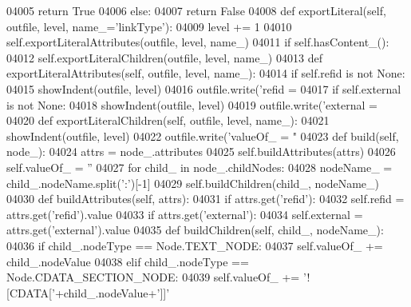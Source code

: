 \begin{DoxyCode}
{{{{{{{{{{{{{{{{{{{{{{{{{{{{{{{{{{{{{{{{{{{{{{{{{{{{{{{{{{{{{{{{{{{{{{{{{{{{{{{{{{{{{{{{{{{{{{{{{{{{{{{{{{{{{{{{{{{{{{{{{{{{{{{{{{{{{{{{{{{{{{{{{{{{{{{{{{{{{{{{{{{{{{{{{{{{{{{{{{{{{{{{{{{{{{{{{{{{{{{{{{{{{{{{{{{{{{{{{{{{{{{{{{{{{{{{{{{{{{{{{{{{{{{{{{{{{{{{{{{{{{04005             \textcolor{keywordflow}{return} \textcolor{keyword}{True}
04006         \textcolor{keywordflow}{else}:
04007             \textcolor{keywordflow}{return} \textcolor{keyword}{False}
04008     \textcolor{keyword}{def }exportLiteral(self, outfile, level, name\_='linkType'):
04009         level += 1
04010         self.exportLiteralAttributes(outfile, level, name\_)
04011         \textcolor{keywordflow}{if} self.hasContent_():
04012             self.exportLiteralChildren(outfile, level, name\_)
04013     \textcolor{keyword}{def }exportLiteralAttributes(self, outfile, level, name\_):
04014         \textcolor{keywordflow}{if} self.refid \textcolor{keywordflow}{is} \textcolor{keywordflow}{not} \textcolor{keywordtype}{None}:
04015             showIndent(outfile, level)
04016             outfile.write(\textcolor{stringliteral}{'refid = %
04017         \textcolor{keywordflow}{if} self.external \textcolor{keywordflow}{is} \textcolor{keywordflow}{not} \textcolor{keywordtype}{None}:
04018             showIndent(outfile, level)
04019             outfile.write(\textcolor{stringliteral}{'external = %
04020     \textcolor{keyword}{def }exportLiteralChildren(self, outfile, level, name\_):
04021         showIndent(outfile, level)
04022         outfile.write(\textcolor{stringliteral}{'valueOf\_ = "%
04023     \textcolor{keyword}{def }build(self, node\_):
04024         attrs = node\_.attributes
04025         self.buildAttributes(attrs)
04026         self.valueOf_ = \textcolor{stringliteral}{''}
04027         \textcolor{keywordflow}{for} child\_ \textcolor{keywordflow}{in} node\_.childNodes:
04028             nodeName\_ = child\_.nodeName.split(\textcolor{stringliteral}{':'})[-1]
04029             self.buildChildren(child\_, nodeName\_)
04030     \textcolor{keyword}{def }buildAttributes(self, attrs):
04031         \textcolor{keywordflow}{if} attrs.get(\textcolor{stringliteral}{'refid'}):
04032             self.refid = attrs.get(\textcolor{stringliteral}{'refid'}).value
04033         \textcolor{keywordflow}{if} attrs.get(\textcolor{stringliteral}{'external'}):
04034             self.external = attrs.get(\textcolor{stringliteral}{'external'}).value
04035     \textcolor{keyword}{def }buildChildren(self, child\_, nodeName\_):
04036         \textcolor{keywordflow}{if} child\_.nodeType == Node.TEXT\_NODE:
04037             self.valueOf_ += child\_.nodeValue
04038         \textcolor{keywordflow}{elif} child\_.nodeType == Node.CDATA\_SECTION\_NODE:
04039             self.valueOf_ += \textcolor{stringliteral}{'![CDATA['}+child\_.nodeValue+\textcolor{stringliteral}{']]'}
}}}}}}}}}}}}}}}}}}}}}}}}}}}}}}}}}}}}}}}}}}}}}}}}}}}}}}}}}}}}}}}}}}}}}}}}}}}}}}}}}}}}}}}}}}}}}}}}}}}}}}}}}}}}}}}}}}}}}}}}}}}}}}}}}}}}}}}}}}}}}}}}}}}}}}}}}}}}}}}}}}}}}}}}}}}}}}}}}}}}}}}}}}}}}}}}}}}}}}}}}}}}}}}}}}}}}}}}}}}}}}}}}}}}}}}}}}}}}}}}}}}}}}}}}}}}}}}}}}}}}}}}}
\end{DoxyCode}
